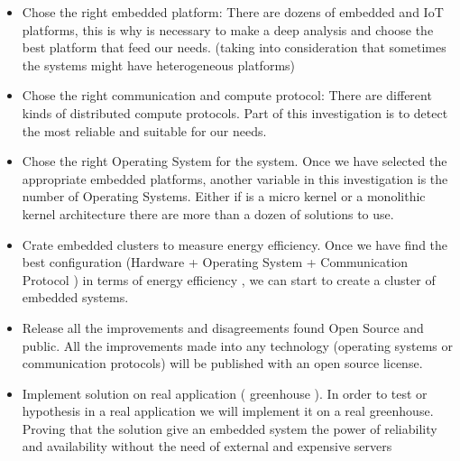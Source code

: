 \begin{itemize}

\item Chose the right embedded platform: There are dozens of embedded and IoT
platforms, this is why is necessary to make a deep analysis and choose the best
platform that feed our needs. (taking into consideration that sometimes the
systems might have heterogeneous platforms)

\item Chose the right communication and compute protocol: There are different
kinds of distributed compute protocols. Part of this investigation is to detect
the most reliable and suitable for our needs.

\item Chose the right Operating System for the system. Once we have selected
the appropriate embedded platforms, another variable in this investigation is
the number of Operating Systems. Either if is a micro kernel or a monolithic
kernel architecture there are more than a dozen of solutions to use.

\item Crate embedded clusters to measure energy efficiency. Once we have find
the best configuration (Hardware + Operating System + Communication Protocol )
in terms of energy efficiency , we can start to create a cluster of embedded
systems.

\item Release all the improvements and disagreements found Open Source and
public. All the improvements made into any technology (operating systems or
communication protocols) will be published with an open source license.

\item Implement solution on real application ( greenhouse ). In order to test
or hypothesis in a real application we will implement it on a real greenhouse.
Proving that the solution give an embedded system the power of reliability and
availability without the need of external and expensive servers 
\end{itemize}


\clearpage
